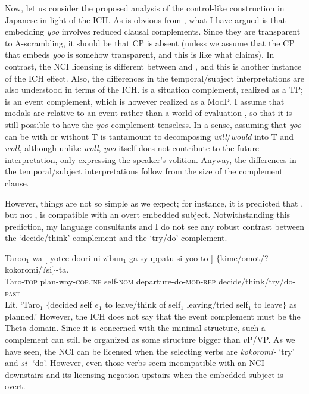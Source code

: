 \documentclass[output=paper]{langsci/langscibook}
\begin{document}
Now, let us consider the proposed analysis of the control-like construction in Japanese in light of the ICH. As is obvious from , what I have argued is that embedding \textit{yoo} involves reduced clausal complements. Since they are transparent to A-scrambling, it should be that CP is absent (unless we assume that the CP that embeds \textit{yoo} is somehow transparent, and this is like what \citealt{uchibori2000} claims). In contrast, the NCI licensing is different between  and , and this is another instance of the ICH effect. Also, the differences in the temporal/subject interpretations are also understood in terms of the ICH.  is a situation complement, realized as a TP;  is an event complement, which is however realized as a ModP. I assume that modals are relative to an event rather than a world of evaluation \citep{hacquard2006}, so that it is still possible to have the \textit{yoo} complement tenseless. In a sense, assuming that \textit{yoo} can be with or without T is tantamount to decomposing \textit{will}/\textit{would} into T and \textit{woll}, although unlike \textit{woll}, \textit{yoo} itself does not contribute to the future interpretation, only expressing the speaker's volition. Anyway, the differences in the temporal/subject interpretations follow from the size of the complement clause.

However, things are not so simple as we expect; for instance, it is predicted that , but not , is compatible with an overt embedded subject. Notwithstanding this prediction, my language consultants and I do not see any robust contrast between the `decide/think' complement and the `try/do' complement.

\ea\label{shimamu31} \gll Taroo$_1$-wa [  yotee-doori-ni zibun$_1$-ga syuppatu-si-yoo-to ] $\{$kime/omot/?kokoromi/?si$\}$-ta.\\
Taro-\textsc{top} {} plan-way-\textsc{cop.inf} self-\textsc{nom} departure-do-\textsc{mod-rep} {} \phantom{$\{$}decide/think/try/do-\textsc{past}\\
\glt Lit. `Taro$_1$ $\{$decided self $e_1$ to leave/think of self$_1$ leaving/tried self$_1$ to leave$\}$ as planned.'
\z
However, the ICH does not say that the event complement must be the Theta domain. Since it is concerned with the minimal structure, such a complement can still be organized as some structure bigger than $v$P/VP. As we have seen, the NCI can be licensed when the selecting verbs are \textit{kokoromi-} `try' and \textit{si-} `do'. However, even those verbs seem incompatible with an NCI downstairs and its licensing negation upstairs when the embedded subject is overt.
\end{document}
